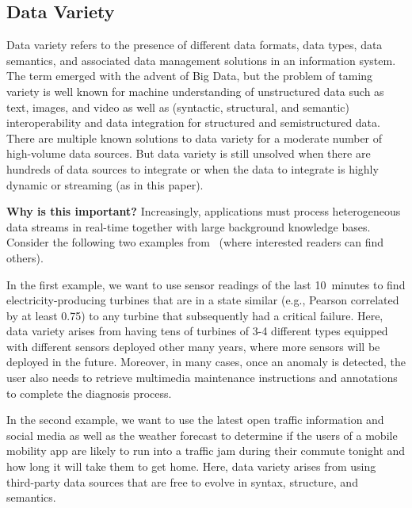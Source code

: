 \subsection{Data Variety}

Data variety refers to the presence of different data formats, data
types, data semantics, and associated data management solutions in an
information system. The term emerged with the advent of Big Data, but
the problem of taming variety is well known for machine understanding
of unstructured data such as text, images, and video as well as
(syntactic, structural, and semantic) interoperability and data
integration for structured and semistructured data.  There are
multiple known solutions to data variety for a moderate number of
high-volume data sources.  But data variety is still unsolved when
there are hundreds of data sources to integrate or when the data to
integrate is highly dynamic or streaming (as in this paper).

\textbf{Why is this important?}
%
Increasingly, applications must process heterogeneous data streams in
real-time together with large background knowledge bases. Consider the
following two examples from~\cite{DellAglioDataScience2017} (where interested readers can find others).

In the first example, we want to use sensor readings of the last
10~minutes to find electricity-producing turbines that are in a state
similar (e.g., Pearson correlated by at least 0.75) to any turbine
that subsequently had a critical failure. Here, data variety arises
from having tens of turbines of 3-4 different types equipped with
different sensors deployed other many years, where more sensors will be
deployed in the future. Moreover, in many cases, once an anomaly is
detected, the user also needs to retrieve multimedia maintenance
instructions and annotations to complete the diagnosis process.

In the second example, we want to use the latest open traffic
information and social media as well as the weather forecast to
determine if the users of a mobile mobility app are likely to run into
a traffic jam during their commute tonight and how long it will take
them to get home. Here, data variety arises from using third-party
data sources that are free to evolve in syntax, structure, and
semantics.



